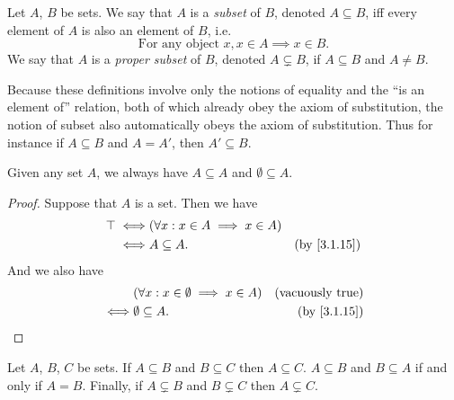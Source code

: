 \begin{defn}[Subsets]\label{3.1.15}
  Let \(A\), \(B\) be sets.
  We say that \(A\) is a \emph{subset} of \(B\), denoted \(A \subseteq B\), iff every element of \(A\) is also an element of \(B\), i.e.
  \[
    \text{For any object } x, x \in A \implies x \in B.
  \]
  We say that \(A\) is a \emph{proper subset} of \(B\), denoted \(A \subsetneq B\), if \(A \subseteq B\) and \(A \neq B\).
\end{defn}

\begin{rmk}\label{3.1.16}
  Because these definitions involve only the notions of equality and the ``is an element of'' relation, both of which already obey the axiom of substitution, the notion of subset also automatically obeys the axiom of substitution.
  Thus for instance if \(A \subseteq B\) and \(A = A'\), then \(A' \subseteq B\).
\end{rmk}

\begin{eg}\label{3.1.17}
  Given any set \(A\), we always have \(A \subseteq A\) and \(\emptyset \subseteq A\).
\end{eg}

\begin{proof}
  Suppose that \(A\) is a set.
  Then we have
  \begin{align*}
    \top \iff & (\forall x : x \in A \implies x \in A)                             \\
    \iff      & A \subseteq A.                         & \text{(by \cref{3.1.15})}
  \end{align*}
  And we also have
  \begin{align*}
         & (\forall x : x \in \emptyset \implies x \in A) & \text{(vacuously true)}   \\
    \iff & \emptyset \subseteq A.                         & \text{(by \cref{3.1.15})}
  \end{align*}
\end{proof}

\begin{prop}\label{3.1.18}
  Let \(A\), \(B\), \(C\) be sets.
  If \(A \subseteq B\) and \(B \subseteq C\) then \(A \subseteq C\).
  \(A \subseteq B\) and \(B \subseteq A\) if and only if \(A = B\).
  Finally, if \(A \subsetneq B\) and \(B \subsetneq C\) then \(A \subsetneq C\).
\end{prop}

